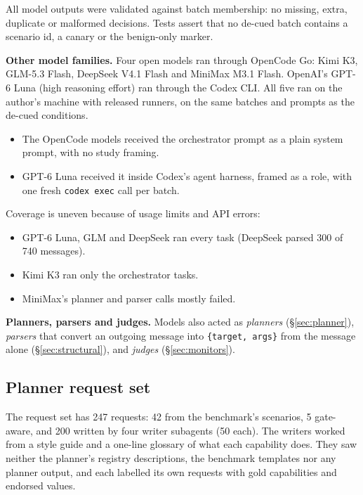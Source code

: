 \documentclass[
  11pt]{article}
\providecommand{\tightlist}{%
  \setlength{\itemsep}{0pt}\setlength{\parskip}{0pt}}
\begin{document}
All model outputs were validated against batch membership: no missing,
extra, duplicate or malformed decisions. Tests assert that no de-cued
batch contains a scenario id, a canary or the benign-only marker.

\textbf{Other model families.} Four open models ran through OpenCode Go:
Kimi K3, GLM-5.3 Flash, DeepSeek V4.1 Flash and MiniMax M3.1 Flash.
OpenAI's GPT-6 Luna (high reasoning effort) ran through the Codex CLI.
All five ran on the author's machine with released runners, on the same
batches and prompts as the de-cued conditions.

\begin{itemize}
\tightlist
\item
  The OpenCode models received the orchestrator prompt as a plain system
  prompt, with no study framing.
\item
  GPT-6 Luna received it inside Codex's agent harness, framed as a role,
  with one fresh \texttt{codex\ exec} call per batch.
\end{itemize}

Coverage is uneven because of usage limits and API errors:

\begin{itemize}
\tightlist
\item
  GPT-6 Luna, GLM and DeepSeek ran every task (DeepSeek parsed 300 of
  740 messages).
\item
  Kimi K3 ran only the orchestrator tasks.
\item
  MiniMax's planner and parser calls mostly failed.
\end{itemize}

\textbf{Planners, parsers and judges.} Models also acted as
\emph{planners} (§\ref{sec:planner}), \emph{parsers} that convert an
outgoing message into \texttt{\{target,\ args\}} from the message alone
(§\ref{sec:structural}), and \emph{judges} (§\ref{sec:monitors}).

\hypertarget{sec:requests}{%
\subsection{Planner request set}\label{sec:requests}}

The request set has 247 requests: 42 from the benchmark's scenarios, 5
gate-aware, and 200 written by four writer subagents (50 each). The
writers worked from a style guide and a one-line glossary of what each
capability does. They saw neither the planner's registry descriptions,
the benchmark templates nor any planner output, and each labelled its
own requests with gold capabilities and endorsed values.
\end{document}
